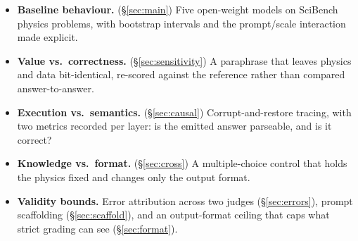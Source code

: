 \documentclass[10pt,letterpaper]{article}
\begin{document}
\begin{itemize}
  \item \textbf{Baseline behaviour.} (\S\ref{sec:main}) Five open-weight models on
        \nbSciBench{} SciBench physics problems, with bootstrap intervals and the
        prompt/scale interaction made explicit.
  \item \textbf{Value vs.\ correctness.} (\S\ref{sec:sensitivity}) A paraphrase
        that leaves physics and data bit-identical, re-scored against the
        reference rather than compared answer-to-answer.
  \item \textbf{Execution vs.\ semantics.} (\S\ref{sec:causal}) Corrupt-and-restore
        tracing, with two metrics recorded per layer: is the emitted answer
        parseable, and is it correct?
  \item \textbf{Knowledge vs.\ format.} (\S\ref{sec:cross}) A multiple-choice
        control that holds the physics fixed and changes only the output format.
  \item \textbf{Validity bounds.} Error attribution across two judges
        (\S\ref{sec:errors}), prompt scaffolding (\S\ref{sec:scaffold}), and an
        output-format ceiling that caps what strict grading can see
        (\S\ref{sec:format}).
\end{itemize}
\end{document}
